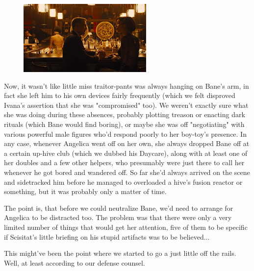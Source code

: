 \begin{figure}
	\begin{center}
		\includegraphics[width=\figwidth]{pics/19/29.png}
	\end{center}
\end{figure}
Now, it wasn't like little miss traitor-pants was always hanging on Bane's arm, in fact she left him to his own devices fairly frequently (which we felt disproved Ivana's assertion that she was "compromised" too). 
We weren't exactly sure what she was doing during these absences, probably plotting treason or enacting dark rituals (which Bane would find boring), or maybe she was off "negotiating" with various powerful male figures who'd respond poorly to her boy-toy's presence. 
In any case, whenever Angelica went off on her own, she always dropped Bane off at a certain up-hive club (which we dubbed his Daycare), along with at least one of her doubles and a few other helpers, who presumably were just there to call her whenever he got bored and wandered off. 
So far she'd always arrived on the scene and sidetracked him before he managed to overloaded a hive's fusion reactor or something, but it was probably only a matter of time.

The point is, that before we could neutralize Bane, we'd need to arrange for Angelica to be distracted too. 
The problem was that there were only a very limited number of things that would get her attention, five of them to be specific if Scisitat's little briefing on his stupid artifacts was to be believed...

This might've been the point where we started to go a just little off the rails. 
Well, at least according to our defense counsel.

